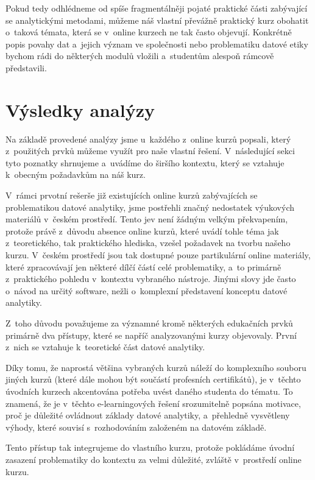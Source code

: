 Pokud tedy odhlédneme od spíše fragmentálněji pojaté praktické části zabývající se analytickými metodami, můžeme náš vlastní převážně praktický kurz obohatit o~taková témata, která se v~online kurzech ne tak často objevují. Konkrétně popis povahy dat a~jejich význam ve společnosti nebo problematiku datové etiky bychom rádi do některých modulů vložili a~studentům alespoň rámcově představili.

\hypertarget{vuxfdsledky-analuxfdzy}{%
\section{Výsledky analýzy}\label{vuxfdsledky-analuxfdzy}}

Na základě provedené analýzy jsme u~každého z~online kurzů popsali, který z~použitých prvků můžeme využít pro naše vlastní řešení. V~následující sekci tyto poznatky shrnujeme a~uvádíme do širšího kontextu, který se vztahuje k~obecným požadavkům na náš kurz.

V~rámci prvotní rešerše již existujících online kurzů zabývajících se problematikou datové analytiky, jsme postřehli značný nedostatek výukových materiálů v~českém prostředí. Tento jev není žádným velkým překvapením, protože právě z~důvodu absence online kurzů, které uvádí tohle téma jak z~teoretického, tak praktického hlediska, vzešel požadavek na tvorbu našeho kurzu. V~českém prostředí jsou tak dostupné pouze partikulární online materiály, které zpracovávají jen některé dílčí částí celé problematiky, a~to primárně z~praktického pohledu v~kontextu vybraného nástroje. Jinými slovy jde často o~návod na určitý software, nežli o~komplexní představení konceptu datové analytiky.

Z~toho důvodu považujeme za významné kromě některých edukačních prvků primárně dva přístupy, které se napříč analyzovanými kurzy objevovaly. První z~nich se vztahuje k~teoretické část datové analytiky.

Díky tomu, že naprostá většina vybraných kurzů náleží do komplexního souboru jiných kurzů (které dále mohou být součástí profesních certifikátů), je v~těchto úvodních kurzech akcentována potřeba uvést daného studenta do tématu. To znamená, že je v~těchto e-learningových řešení srozumitelně popsána motivace, proč je důležité ovládnout základy datové analytiky, a~přehledně vysvětleny výhody, které souvisí s~rozhodováním založeném na datovém základě.

Tento přístup tak integrujeme do vlastního kurzu, protože pokládáme úvodní zasazení problematiky do kontextu za velmi důležité, zvláště v~prostředí online kurzu.

